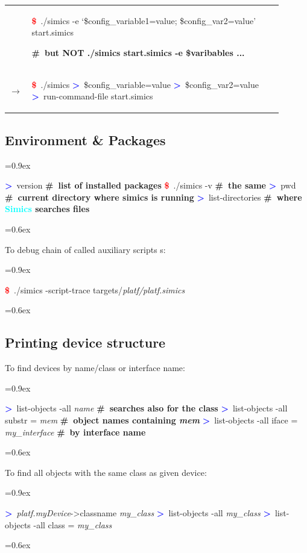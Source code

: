\documentclass[8pt]{extarticle}
\newenvironment{code}[1][]{%
\begin{prebox}[#1]\obeylines%
\fontdimen2\font=0.9ex%
}{%
\end{prebox}%
\fontdimen2\font=0.6ex%
}
\newenvironment{codem}[2][\linewidth]{%
\begin{minipage}{#1}%
\begin{prebox}[colback=#2]\obeylines}{%
\end{prebox}%
\end{minipage}}
\newenvironment{code9}{%
\begin{codem}[0.9\linewidth]{green!10}}{\end{codem}}
\newcommand{\cod}[2][green!10]{\tcbox[
    size=fbox,
    on line,
    colback=#1,
    colframe=black,
    arc=0.3em  %
]{#2}}
\newcommand{\ind}{\hphantom{~~~}}
\newcommand{\prompt}{\textcolor{red}{\textbf{\$}\ }}
\newcommand{\sprompt}{\textcolor{blue}{\textbf{>}\ }}
\newcommand{\cmtcommon}[1]{\textcolor{Sepia}{\textbf{#1}}}
\newcommand{\cmt}[1]{\cmtcommon{\#\ #1}}
\newcommand{\p}[1]{\textit{\large#1}}
\newcommand{\Simics}{\textcolor{cyan}{\textbf{Simics}}}
\begin{document}
\begin{multicols*}{3}
\begin{tabular}{p{0.05\linewidth}p{0.85\linewidth}}
        & \begin{code9}
            \prompt ./simics -e ‘\$config_variable1=value; \$config_var2=value’ start.simics

            \cmt{but NOT ./simics start.simics -e \$varibables ...}
        \end{code9}
        \vspace{0.05cm}
        \\
        $\longrightarrow$ &
        \begin{code9}
            \prompt ./simics
            \sprompt \$config_variable=value
            \sprompt \$config_var2=value
            \sprompt run-command-file start.simics
        \end{code9}
    \end{tabular}

\subsection{Environment \& Packages}
    \begin{code}
        \sprompt version  \cmt{list of installed packages}
        \prompt ./simics -v \cmt{the same}
        \sprompt pwd \cmt{current directory where simics is running}
        \sprompt list-directories \cmt{where \Simics{} searches files}
    \end{code}


    To debug chain of called auxiliary scripts \cod{include}s:
    \begin{code}
        \prompt ./simics -script-trace targets/\p{platf/platf.simics}
    \end{code}

\subsection{Printing device structure}
To find devices by name/class or interface name:
    \begin{code}
        \sprompt list-objects -all \p{name} \ind \cmt{searches also for the class}
        \sprompt list-objects -all substr = \p{mem} \cmt{object names containing \p{mem}}
        \sprompt list-objects -all iface = \p{my_interface} \cmt{by interface name}
    \end{code}

To find all objects with the same class as given device:
        \begin{code}
            \sprompt \p{platf.myDevice}->classname
            \p{my_class}
            \sprompt list-objects -all \p{my_class}
            \sprompt list-objects -all class = \p{my_class}
        \end{code}


\end{multicols*}
\end{document}
